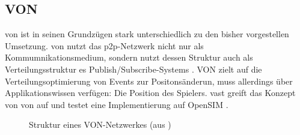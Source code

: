 \subsection{VON}
\label{chap:related:von}
\ac{von} ist in seinen Grundzügen stark unterschiedlich zu den bisher vorgestellen Umsetzung. \ac{von} nutzt das \ac{p2p}-Netzwerk nicht nur als Kommumnikationsmedium, sondern nutzt dessen Struktur auch als Verteilungsstruktur es Publish/Subscribe-Systems \cite{Hu2006VON}. VON zielt auf die Verteilungsoptimierung von Events zur Positonsänderun, muss allerdings über Applikationswissen verfügen: Die Position des Spielers. \ac{vast} \cite{Backhaus2007Voronoibased} greift das Konzept von \ac{von} auf und testet eine Implementierung auf OpenSIM \cite{Baumgart2007OverSim}.

\begin{figure}[htbp]
\centering
{}
\caption{Struktur eines VON-Netzwerkes (aus \cite{Backhaus2007Voronoibased})}
\label{fig:von}
\end{figure}

